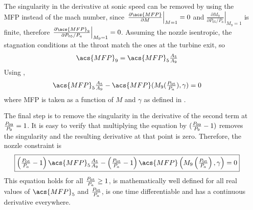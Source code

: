 The singularity in the derivative at sonic speed can be removed by using the \ac{MFP} instead of the mach number, since 
$\left.\frac{\partial\acs{MFP}}{\partial M} \right|_{M=1} = 0$ 
and 
$\left.\frac{\partial M_9}{\partial P_{05}/P_a}\right|_{M_9=1}$ is finite, 
therefore $\left.\frac{\partial\acs{MFP}_9}{\partial P_{05}/P_a}\right|_{M_9=1}=0$.
 Assuming the nozzle isentropic, the stagnation conditions at the throat match the ones at the turbine exit, so
\begin{equation}
    \acs{MFP}_9 = \acs{MFP}_5 \tfrac{A_5}{A_9}
\end{equation}
Using ,
\begin{equation}
    \textstyle
    \acs{MFP}_5 \tfrac{A_5}{A_9} - \acs{MFP}(M_9(\pr{05}{a}), \gamma) = 0
\end{equation}
where \acs{MFP} is taken as a function of $M$ and $\gamma$ as defined in .

The final step is to remove the singularity in the derivative of the second term at $\frac{P_{09}}{P_{9}} = 1$. 
It is easy to verify that multiplying the equation by $(\frac{P_{09}}{P_{9}}-1)$ removes the singularity and the resulting derivative at that point is zero. 
Therefore, the nozzle constraint is
\begin{equation}
    \label{eqn:nozzle}
    \boxed{
    \textstyle
        \left(\pr{05}{a}-1\right)\acs{MFP}_5\frac{A_5}{A_9} - \left(\pr{05}{a}-1\right)\acs{MFP}\left(M_9\left(\pr{05}{a}\right), \gamma\right) = 0
    }
\end{equation}
This equation holds for all $\frac{P_{05}}{P_{a}} \geq 1$, is mathematically well defined for all real values of $\acs{MFP}_5$ and $\frac{P_{05}}{P_{a}}$, is one time differentiable and has a continuous derivative everywhere.

